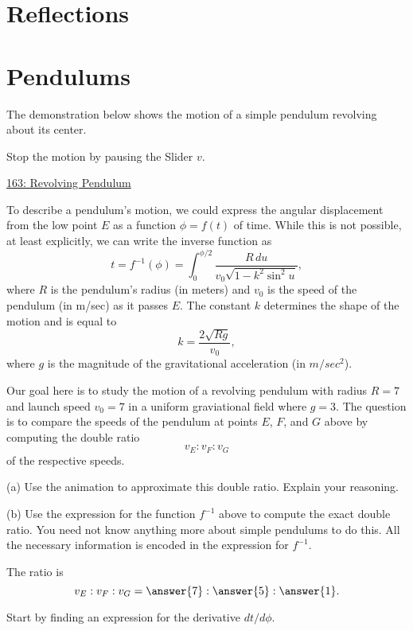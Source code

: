\documentclass{ximera}
\begin{document}
\section*{Reflections}


\section*{Pendulums}

\begin{question}  \label{QDfdfgrenhht44}
The demonstration below shows the motion of a simple pendulum revolving about its center.

Stop the motion by pausing the Slider $v$. 
\begin{onlineOnly}
    \begin{center}
\end{center}
\end{onlineOnly}

\href{https://www.desmos.com/calculator/nsfqtjr8fd}{163: Revolving Pendulum}

To describe a pendulum's motion, we could express the angular displacement from the low point $E$ as a function $\phi = f(t)$ of time. While this is not possible, at least explicitly, we can write the inverse function as
\[
     t = f^{-1}(\phi) = \int_0^{\phi/2} \frac{R\, du}{v_0\sqrt{1-k^2\sin^2u}} ,
\]
where $R$ is the pendulum's radius (in meters) and $v_0$ is the speed of the pendulum (in m/sec) as it passes $E$. The constant $k$ determines the shape of the motion and is equal to
\[
        k = \frac{2\sqrt{Rg}}{v_0} ,
\]
where $g$ is the magnitude of the gravitational acceleration (in $m/sec^2$).

Our goal here is to study the motion of a revolving pendulum with radius $R=7$ and launch speed $v_0=7$ in a uniform graviational field where $g=3$. The question is to compare the speeds of the pendulum at points $E$, $F$, and $G$ above by computing the double ratio
\[
  v_E : v_F : v_G
\]
of the respective speeds.

\begin{freeResponse}
(a) Use the animation to approximate this double ratio. Explain your reasoning.
\end{freeResponse}


(b) Use the expression for the function $f^{-1}$ above to compute the exact double ratio. You need not know anything more about simple pendulums to do this. All the necessary information is encoded in the expression for $f^{-1}$. 

The ratio is
\[
      v_E : v_F : v_G = \answer{7}: \answer{5}:\answer{1} .
\]



\begin{hint}
Start by finding an expression for the derivative $dt/d\phi$.
\end{hint}

\end{question}
\end{document}
